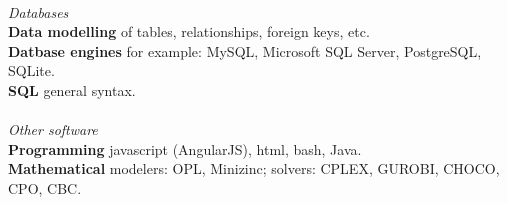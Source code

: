 		\\\textsl{Databases}\\	
					\hspace*{2ex}\textbf{Data modelling} of tables, relationships, foreign keys, etc.\\
					\hspace*{2ex}\textbf{Datbase engines} for example: MySQL, Microsoft SQL Server, PostgreSQL, SQLite.\\
					\hspace*{2ex}\textbf{SQL} general syntax.\\
		\\\textsl{Other software}\\				
			\hspace*{2ex}\textbf{Programming} javascript (AngularJS), html, bash, Java. \\
			\hspace*{2ex}\textbf{Mathematical} modelers: OPL, Minizinc; solvers: CPLEX, GUROBI, CHOCO, CPO, CBC. \\